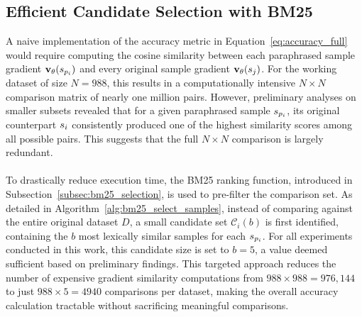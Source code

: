 \subsection{Efficient Candidate Selection with BM25}\label{subsec:setup_bm25}
A naive implementation of the accuracy metric in Equation~\ref{eq:accuracy_full} would require computing the cosine similarity between each paraphrased sample gradient $\mathbf{v}_{\theta}(s_{p_i})$ and every original sample gradient $\mathbf{v}_{\theta}(s_j)$. For the working dataset of size $N=988$, this results in a computationally intensive $N \times N$ comparison matrix of nearly one million pairs. However, preliminary analyses on smaller subsets revealed that for a given paraphrased sample $s_{p_i}$, its original counterpart $s_i$ consistently produced one of the highest similarity scores among all possible pairs. This suggests that the full $N \times N$ comparison is largely redundant.
\\\\
To drastically reduce execution time, the BM25 ranking function, introduced in Subsection~\ref{subsec:bm25_selection}, is used to pre-filter the comparison set. As detailed in Algorithm~\ref{alg:bm25_select_samples}, instead of comparing against the entire original dataset $D$, a small candidate set $\mathcal{C}_i(b)$ is first identified, containing the $b$ most lexically similar samples for each $s_{p_i}$. For all experiments conducted in this work, this candidate size is set to $b=5$, a value deemed sufficient based on preliminary findings. This targeted approach reduces the number of expensive gradient similarity computations from $988 \times 988 = 976{,}144$ to just $988 \times 5 = 4940$ comparisons per dataset, making the overall accuracy calculation tractable without sacrificing meaningful comparisons.


